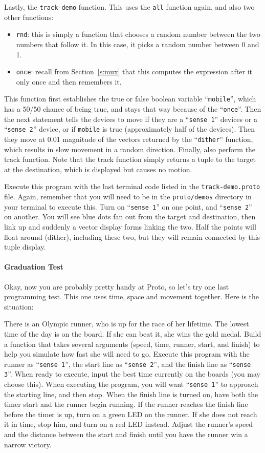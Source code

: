 \documentclass{article}
\newcommand\var[1]{{\tt #1}}
\newcommand\qvar[1]{``{\tt #1}''}
\begin{document}
Lastly, the \var{track-demo} function.  This uses the \var{all}
function again, and also two other functions:
\begin{itemize}
\item \var{rnd}: this is simply a function that chooses a random
  number between the two numbers that follow it.  In this case, it
  picks a random number between 0 and 1.
\item \var{once}: recall from Section~\ref{s:mux} that this computes
  the expression after it only once and then remembers it.
\end{itemize}

This function first establishes the true or false boolean variable
\qvar{mobile}, which has a 50/50 chance of being true, and stays that
way because of the \qvar{once}.  Then the next statement tells the
devices to move if they are a \qvar{sense 1} devices or a \qvar{sense
  2} device, or if \var{mobile} is true (approximately half of the
devices).  Then they move at 0.01 magnitude of the vectors returned by
the \qvar{dither} function, which results in slow movement in a random
direction.  Finally, also perform the track function.  Note that the
track function simply returns a tuple to the target at the
destination, which is displayed but causes no motion.

Execute this program with the last terminal code listed in the
\var{track-demo.proto} file.  Again, remember that you will need to be
in the \var{proto/demos} directory in your terminal to execute this.
Turn on \qvar{sense 1} on one point, and \qvar{sense 2} on another.
You will see blue dots fan out from the target and destination, then
link up and suddenly a vector display forms linking the two.  Half the
points will float around (dither), including these two, but they will
remain connected by this tuple display.


\paragraph{Graduation Test}

Okay, now you are probably pretty handy at Proto, so let's try one
last programming test.  This one uses time, space and movement
together.  Here is the situation:

There is an Olympic runner, who is up for the race of her lifetime.
The lowest time of the day is on the board.  If she can beat it, she
wins the gold medal.  Build a function that takes several arguments
(speed, time, runner, start, and finish) to help you simulate how fast
she will need to go.  Execute this program with the runner as
\qvar{sense 1}, the start line as \qvar{sense 2}, and the finish line
as \qvar{sense 3}.  When ready to execute, input the best time
currently on the boards (you may choose this).  When executing the
program, you will want \qvar{sense 1} to approach the starting line,
and then stop.  When the finish line is turned on, have both the timer
start and the runner begin running.  If the runner reaches the finish
line before the timer is up, turn on a green LED on the runner.  If
she does not reach it in time, stop him, and turn on a red LED
instead.  Adjust the runner's speed and the distance between the start
and finish until you have the runner win a narrow victory.
\end{document}
